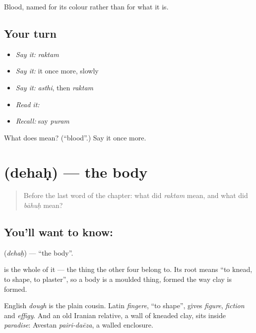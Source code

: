 \begin{grammarlens}[title={What you've built}]
Blood, named for its colour rather than for what it is.
\end{grammarlens}

\subsection*{Your turn}
\begin{itemize}
\raggedright
  \item \emph{Say it:} \emph{raktam}
  \item \emph{Say it:} it once more, slowly
  \item \emph{Say it:} \emph{asthi}, then \emph{raktam}
  \item \emph{Read it:} \textbf{}
  \item \emph{Recall:} say \emph{puram}
\end{itemize}

\begin{tcolorbox}[breakable,colback=teal!4,colframe=teal!35!black,title={Before you move on}]
What does  mean? (\textquotedblleft{}blood\textquotedblright{}.) Say it once more.
\end{tcolorbox}
\section[\texorpdfstring{\sk{देहः} (dehaḥ)}{देहः (dehaḥ)}]{ (dehaḥ) — the body}

\label{lesson:SA-C34-body}



\begin{quote}
Before the last word of the chapter: what did \emph{raktam} mean, and what did \emph{bāhuḥ} mean?
\end{quote}

\subsection*{You'll want to know: }
\textbf{} (\emph{dehaḥ}) — \textquotedblleft{}the body\textquotedblright{}.

\textbf{} is the whole of it — the thing the other four belong to. Its root means \textquotedblleft{}to knead, to shape, to plaster\textquotedblright{}, so a body is a moulded thing, formed the way clay is formed.

English \emph{dough} is the plain cousin. Latin \emph{fingere}, \textquotedblleft{}to shape\textquotedblright{}, gives \emph{figure}, \emph{fiction} and \emph{effigy}. And an old Iranian relative, a wall of kneaded clay, sits inside \emph{paradise}: Avestan \emph{pairi-daēza}, a walled enclosure.

